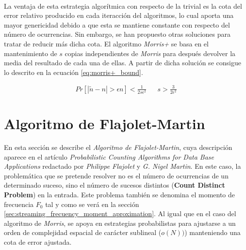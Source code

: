 \documentclass{subfiles}
\begin{document}
      \paragraph{}
      La ventaja de esta estrategia algorítmica con respecto de la trivial es la cota del error relativo producido en cada iteracción del algoritmos, lo cual aporta una mayor genericidad debido a que esta se mantiene constante con respecto del número de ocurrencias. Sin embargo, se han propuesto otras soluciones para tratar de reducir más dicha cota. El algoritmo \emph{Morris+} se basa en el mantenimiento de $s$ copias independientes de \emph{Morris} para después devolver la media del resultado de cada una de ellas. A partir de dicha solución se consigue lo descrito en la ecuación \eqref{eq:morris+_bound}.

      \begin{align}
      \label{eq:morris+_bound}
        Pr[|\widetilde{n} - n| > \epsilon n ] < \frac{1}{2s\epsilon^2} && s > \frac{3}{2\epsilon^2}
      \end{align}



    \section{Algoritmo de Flajolet-Martin}
    \label{sec:streaming_morris_algorithm}

      \paragraph{}
      En esta sección se describe el \emph{Algoritmo de Flajolet-Martin}, cuya descripción aparece en el artículo \emph{Probabilistic Counting Algorithms for Data Base Applications} \cite{flajolet1985probabilistic} redactado por \emph{Philippe Flajolet} y \emph{G. Nigel Martin}. En este caso, la problemática que se pretende resolver no es el número de ocurrencias de un determinado suceso, sino el número de sucesos distintos (\textbf{Count Distinct Problem}) en la entrada. Este problema también se denomina el momento de frecuencia $F_0$ tal y como se verá en la sección \ref{sec:streaming_frecuency_moment_aproximation}. Al igual que en el caso del algoritmo de \emph{Morris}, se apoya en estrategias probabilistas para ajustarse a un orden de complejidad espacial de carácter sublineal ($o(N))$) manteniendo una cota de error ajustada.
\end{document}

